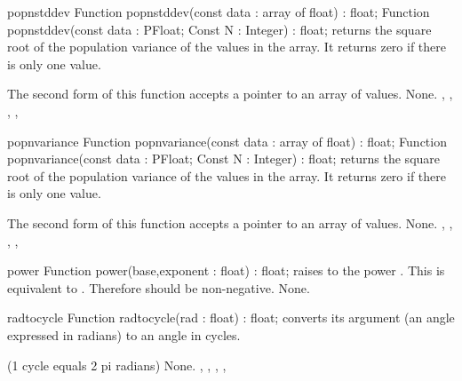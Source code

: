 

\begin{function}{popnstddev}
\Declaration
Function popnstddev(const data : array of float) : float;
Function popnstddev(const data : PFloat; Const N : Integer) : float;
\Description
{} returns the square root of the population variance of
the values in the   array. It returns zero if there is only one value.

The second form of this function accepts a pointer to an array of 
values.
\Errors
None.
\SeeAlso
{}, , , ,
\end{function}



\begin{function}{popnvariance}
\Declaration
Function popnvariance(const data : array of float) : float;
Function popnvariance(const data : PFloat; Const N : Integer) : float;
\Description
{} returns the square root of the population variance of
the values in the   array. It returns zero if there is only one value.

The second form of this function accepts a pointer to an array of 
values.
\Errors
None.
\SeeAlso
{}, , , ,
\end{function}



\begin{function}{power}
\Declaration
Function power(base,exponent : float) : float;
\Description
{} raises  to the power . This is equivalent
to . Therefore  should be non-negative.
\Errors
None.
\SeeAlso
{}
\end{function}



\begin{function}{radtocycle}
\Declaration
Function radtocycle(rad : float) : float;
\Description
{} converts its argument  (an angle expressed in
radians) to an angle in cycles.

(1 cycle equals 2 pi radians)
\Errors
None.
\SeeAlso
{}, , ,
, 
\end{function}

